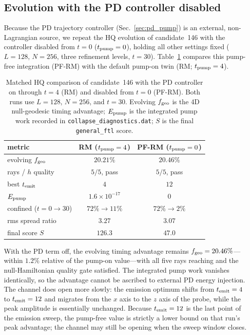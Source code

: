 \documentclass[twocolumn,floatfix,aps,prd,nofootinbib]{revtex4-2}
\begin{document}
\subsection{Evolution with the PD controller disabled}
\label{sec:pump_free}

Because the PD trajectory controller (Sec.~\ref{sec:pd_pump}) is an
external, non-Lagrangian source, we repeat the HQ evolution of
candidate~146 with the controller disabled from $t=0$
($t_{\rm pump}=0$), holding all other settings fixed ($L=128$, $N=256$,
three refinement levels, $t=30$). Table~\ref{tab:pump_compare} compares this
pump-free integration (PF-RM) with the default pump-on twin (RM;
$t_{\rm pump}=4$).

\begin{table}[tbp]
\caption{Matched HQ comparison of candidate~146 with the PD controller on
through $t=4$ (RM) and disabled from $t=0$ (PF-RM). Both runs use
$L=128$, $N=256$, and $t=30$. Evolving $f_{\rm geo}$ is the 4D
null-geodesic timing advantage; $E_{\rm pump}$ is the integrated pump work
recorded in \texttt{collapse\_diagnostics.dat}; $S$ is the final
\texttt{general\_ftl} score.}
\label{tab:pump_compare}
\begin{ruledtabular}
\begin{tabular}{lcc}
metric & RM ($t_{\rm pump}=4$) & PF-RM ($t_{\rm pump}=0$) \\
\hline
evolving $f_{\rm geo}$ & $20.21\%$ & $20.46\%$ \\
rays / $h$ quality & $5/5$, pass & $5/5$, pass \\
best $t_{\rm emit}$ & $4$ & $12$ \\
$E_{\rm pump}$ & $1.6\times10^{-17}$ & $0$ \\
confined ($t{=}0\to30$) & $72\%\to11\%$ & $72\%\to2\%$ \\
rms spread ratio & $3.27$ & $3.07$ \\
final score $S$ & $126.3$ & $47.0$ \\
\end{tabular}
\end{ruledtabular}
\end{table}

With the PD term off, the evolving timing advantage remains
$f_{\rm geo}=20.46\%$---within $1.2\%$ relative of the pump-on value---with
all five rays reaching and the null-Hamiltonian quality gate satisfied. The
integrated pump work vanishes identically, so the advantage cannot be
ascribed to external PD energy injection. The channel does open more slowly:
the emission optimum shifts from $t_{\rm emit}=4$ to $t_{\rm emit}=12$ and
migrates from the $x$ axis to the $z$ axis of the probe, while the peak
amplitude is essentially unchanged. Because $t_{\rm emit}=12$ is the last
point of the emission sweep, the pump-free value is strictly a lower bound on
that run's peak advantage; the channel may still be opening when the sweep
window closes.
\end{document}
